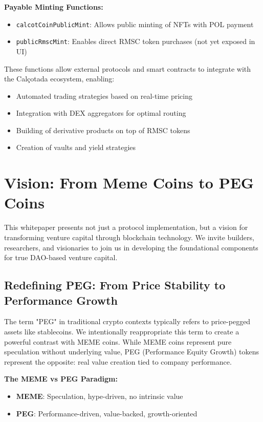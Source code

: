 \documentclass[conference]{IEEEtran}
\begin{document}
\textbf{Payable Minting Functions:}
\begin{itemize}
    \item \texttt{calcotCoinPublicMint}: Allows public minting of NFTs with POL payment
    \item \texttt{publicRmscMint}: Enables direct RMSC token purchases (not yet exposed in UI)
\end{itemize}

These functions allow external protocols and smart contracts to integrate with the Calçotada ecosystem, enabling:
\begin{itemize}
    \item Automated trading strategies based on real-time pricing
    \item Integration with DEX aggregators for optimal routing
    \item Building of derivative products on top of RMSC tokens
    \item Creation of vaults and yield strategies
\end{itemize}

\section{Vision: From Meme Coins to PEG Coins}

This whitepaper presents not just a protocol implementation, but a vision for transforming venture capital through blockchain technology. We invite builders, researchers, and visionaries to join us in developing the foundational components for true DAO-based venture capital.

\subsection{Redefining PEG: From Price Stability to Performance Growth}

The term "PEG" in traditional crypto contexts typically refers to price-pegged assets like stablecoins. We intentionally reappropriate this term to create a powerful contrast with MEME coins. While MEME coins represent pure speculation without underlying value, PEG (Performance Equity Growth) tokens represent the opposite: real value creation tied to company performance.

\textbf{The MEME vs PEG Paradigm:}
\begin{itemize}
    \item \textbf{MEME}: Speculation, hype-driven, no intrinsic value
    \item \textbf{PEG}: Performance-driven, value-backed, growth-oriented
\end{itemize}
\end{document}
